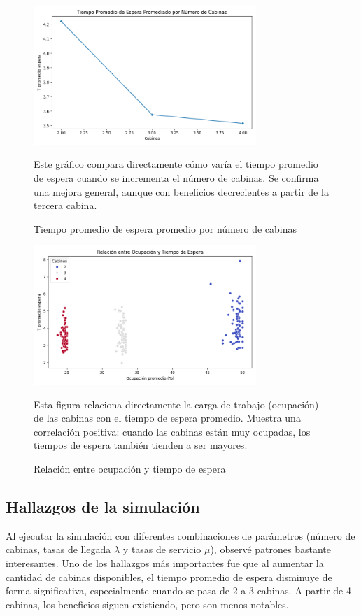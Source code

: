 \documentclass[12pt]{article}
\begin{document}
    \begin{figure}[H]
    \centering
    \includegraphics[width=0.75\textwidth]{line_espera_promedio.png}
    \caption{Tiempo promedio de espera promedio por número de cabinas}
    \small Este gráfico compara directamente cómo varía el tiempo promedio de espera cuando se incrementa el número de cabinas. Se confirma una mejora general, aunque con beneficios decrecientes a partir de la tercera cabina.
    \end{figure}
    
    \begin{figure}[H]
    \centering
    \includegraphics[width=0.75\textwidth]{scatter_ocupacion_espera.png}
    \caption{Relación entre ocupación y tiempo de espera}
    \small Esta figura relaciona directamente la carga de trabajo (ocupación) de las cabinas con el tiempo de espera promedio. Muestra una correlación positiva: cuando las cabinas están muy ocupadas, los tiempos de espera también tienden a ser mayores.
    \end{figure}

    \subsection*{Hallazgos de la simulación}

    Al ejecutar la simulación con diferentes combinaciones de parámetros (número de cabinas, tasas de llegada $\lambda$ y tasas de servicio $\mu$), observé patrones bastante interesantes. Uno de los hallazgos más importantes fue que al aumentar la cantidad de cabinas disponibles, el tiempo promedio de espera disminuye de forma significativa, especialmente cuando se pasa de 2 a 3 cabinas. A partir de 4 cabinas, los beneficios siguen existiendo, pero son menos notables.
    
\end{document}
